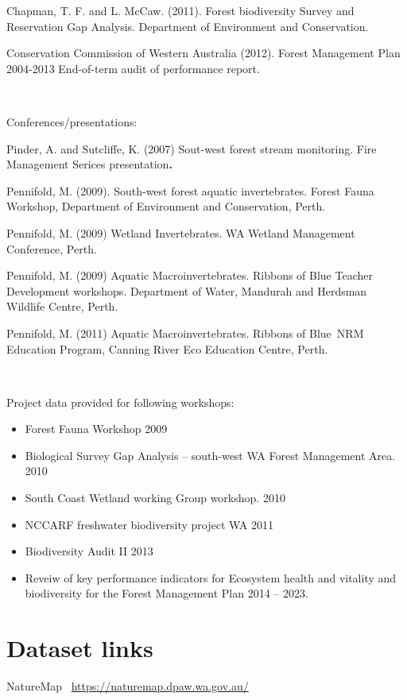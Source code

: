 \documentclass[version=last, 
    paper=a4, %
    10pt, %
    usenames,
    dvipsnames, 
    oneside, %
    headings=openany, %
    DIV=15 %
]{scrbook}
\begin{document}
Chapman, T. F. and L. McCaw. (2011). Forest biodiversity Survey and
Reservation Gap Analysis. Department of Environment and Conservation.

Conservation Commission of Western Australia (2012). Forest Management
Plan 2004-2013 End-of-term audit of performance report.

~

Conferences/presentations:

Pinder, A. and Sutcliffe, K. (2007) Sout-west forest stream monitoring.
Fire Management Serices presentation\textbf{.}

Pennifold, M. (2009). South-west forest aquatic invertebrates. Forest
Fauna Workshop, Department of Environment and Conservation, Perth.

Pennifold, M. (2009) Wetland Invertebrates. WA Wetland Management
Conference, Perth.

Pennifold, M. (2009) Aquatic Macroinvertebrates. Ribbons of Blue Teacher
Development workshops. Department of Water, Mandurah and Herdsman
Wildlife Centre, Perth.

Pennifold, M. (2011) Aquatic Macroinvertebrates. Ribbons of Blue~NRM
Education Program, Canning River Eco Education Centre, Perth.

~

Project data provided for following workshops:

\begin{itemize}
\itemsep1pt\parskip0pt
\item
  Forest Fauna Workshop 2009
\item
  Biological Survey Gap Analysis -- south-west WA Forest Management
  Area. 2010
\item
  South Coast Wetland working Group workshop. 2010
\item
  NCCARF freshwater biodiversity project WA 2011
\item
  Biodiversity Audit II 2013
\item
  Reveiw of key performance indicators for Ecosystem health and vitality
  and biodiversity for the Forest Management Plan 2014 -- 2023.
\end{itemize}



\section*{Dataset links}
NatureMap~
\href{https://naturemap.dpaw.wa.gov.au/}{https://naturemap.dpaw.wa.gov.au/}
\end{document}

